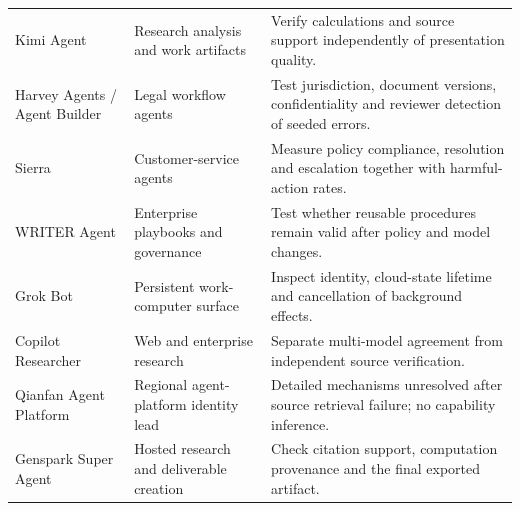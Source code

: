 \begin{longtable}{L{25mm}L{35mm}L{48mm}}
Kimi Agent\cite{executionproduct088} & Research analysis and work artifacts & Verify calculations and source support independently of presentation quality. \\
Harvey Agents / Agent Builder\cite{executionproduct090} & Legal workflow agents & Test jurisdiction, document versions, confidentiality and reviewer detection of seeded errors. \\
Sierra\cite{executionproduct092} & Customer-service agents & Measure policy compliance, resolution and escalation together with harmful-action rates. \\
WRITER Agent\cite{executionproduct093} & Enterprise playbooks and governance & Test whether reusable procedures remain valid after policy and model changes. \\
Grok Bot\cite{executionproduct094} & Persistent work-computer surface & Inspect identity, cloud-state lifetime and cancellation of background effects. \\
Copilot Researcher\cite{executionproduct098} & Web and enterprise research & Separate multi-model agreement from independent source verification. \\
Qianfan Agent Platform\cite{executionproduct099} & Regional agent-platform identity lead & Detailed mechanisms unresolved after source retrieval failure; no capability inference. \\
Genspark Super Agent\cite{executionproduct100} & Hosted research and deliverable creation & Check citation support, computation provenance and the final exported artifact. \\
\bottomrule\end{longtable}
\endgroup
